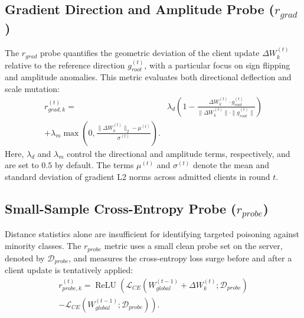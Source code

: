 \documentclass[final,5p,times,twocolumn]{elsarticle/elsarticle}
\begin{document}
\subsection{Gradient Direction and Amplitude Probe \texorpdfstring{($r_{grad}$)}{(r-grad)}}
The $r_{grad}$ probe quantifies the geometric deviation of the client update $\Delta W_k^{(t)}$ relative to the reference direction $g_{root}^{(t)}$, with a particular focus on sign flipping and amplitude anomalies. This metric evaluates both directional deflection and scale mutation:
\begin{equation}
    \begin{aligned}
        r_{grad,k}^{(t)} ={} & \lambda_d \left(1-\frac{\Delta W_k^{(t)} \cdot g_{root}^{(t)}}{\|\Delta W_k^{(t)}\| \cdot \|g_{root}^{(t)}\|}\right) \\
        + \lambda_m \max\left(0,\frac{\|\Delta W_k^{(t)}\|_2-\mu^{(t)}}{\sigma^{(t)}}\right).
    \end{aligned}
\end{equation}
Here, $\lambda_d$ and $\lambda_m$ control the directional and amplitude terms, respectively, and are set to $0.5$ by default. The terms $\mu^{(t)}$ and $\sigma^{(t)}$ denote the mean and standard deviation of gradient L2 norms across admitted clients in round $t$.

\subsection{Small-Sample Cross-Entropy Probe \texorpdfstring{($r_{probe}$)}{(r-probe)}}
Distance statistics alone are insufficient for identifying targeted poisoning against minority classes. The $r_{probe}$ metric uses a small clean probe set on the server, denoted by $\mathcal{D}_{probe}$, and measures the cross-entropy loss surge before and after a client update is tentatively applied:
\begin{equation}
    \begin{aligned}
        r_{probe,k}^{(t)} = \operatorname{ReLU}\left(
        \mathcal{L}_{CE}(W_{global}^{(t-1)}+\Delta W_k^{(t)};\mathcal{D}_{probe})
        \right. \\
        \left.
        - \mathcal{L}_{CE}(W_{global}^{(t-1)};\mathcal{D}_{probe})
        \right).
    \end{aligned}
\end{equation}
\end{document}
